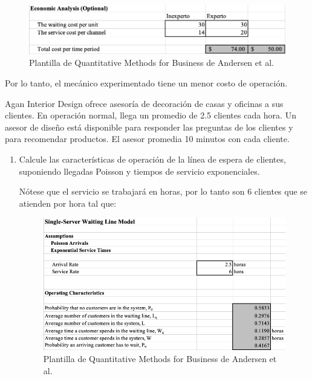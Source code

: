 \begin{problema}
\begin{enumerate}
\begin{sol}
			\begin{figure}[H]
				\centering
				\includegraphics[scale=0.4]{Images/2}
				\caption{Plantilla de Quantitative Methods for Business de Andersen et al. }
			\end{figure}
		Por lo tanto, el mecánico experimentado tiene un menor costo de operación.
		\end{sol}
	\end{enumerate}
\end{problema}

\begin{problema}
	Agan Interior Design ofrece asesoría de decoración de casas y oficinas a sus clientes. En operación normal, llega un promedio de 2.5 clientes cada hora. Un asesor de diseño está disponible para responder las preguntas de los clientes y para recomendar productos. El asesor promedia 10 minutos con cada cliente.
	\begin{enumerate}
		\item Calcule las características de operación de la línea de espera de clientes, suponiendo llegadas Poisson y tiempos de servicio exponenciales.
		\begin{sol}
			Nótese que el servicio se trabajará en horas, por lo tanto son 6 clientes que se atienden por hora tal que: 
				\begin{figure}[H]
				\centering
				\includegraphics[scale=0.4]{Images/3}
				\caption{Plantilla de Quantitative Methods for Business de Andersen et al. }
			\end{figure}
		\end{sol}

\end{enumerate}
\end{problema}
